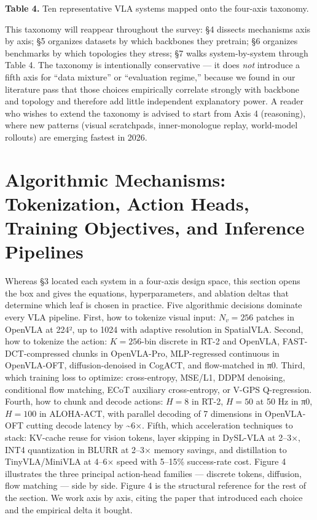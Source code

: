 \textbf{Table 4.} Ten representative VLA systems mapped onto the four-axis taxonomy.

This taxonomy will reappear throughout the survey: §4 dissects mechanisms axis by axis; §5 organizes datasets by which backbones they pretrain; §6 organizes benchmarks by which topologies they stress; §7 walks system-by-system through Table 4. The taxonomy is intentionally conservative --- it does \emph{not} introduce a fifth axis for ``data mixture'' or ``evaluation regime,'' because we found in our literature pass that those choices empirically correlate strongly with backbone and topology and therefore add little independent explanatory power. A reader who wishes to extend the taxonomy is advised to start from Axis 4 (reasoning), where new patterns (visual scratchpads, inner-monologue replay, world-model rollouts) are emerging fastest in 2026.

\section{Algorithmic Mechanisms: Tokenization, Action Heads, Training Objectives, and Inference Pipelines}\label{algorithmic-mechanisms-tokenization-action-heads-training-objectives-and-inference-pipelines}

Whereas §3 located each system in a four-axis design space, this section opens the box and gives the equations, hyperparameters, and ablation deltas that determine which leaf is chosen in practice. Five algorithmic decisions dominate every VLA pipeline. First, how to tokenize visual input: \(N_v=256\) patches in OpenVLA at 224², up to 1024 with adaptive resolution in SpatialVLA. Second, how to tokenize the action: \(K=256\)-bin discrete in RT-2 and OpenVLA, FAST-DCT-compressed chunks in OpenVLA-Pro, MLP-regressed continuous in OpenVLA-OFT, diffusion-denoised in CogACT, and flow-matched in π0. Third, which training loss to optimize: cross-entropy, MSE/L1, DDPM denoising, conditional flow matching, ECoT auxiliary cross-entropy, or V-GPS Q-regression. Fourth, how to chunk and decode actions: \(H=8\) in RT-2, \(H=50\) at 50 Hz in π0, \(H=100\) in ALOHA-ACT, with parallel decoding of 7 dimensions in OpenVLA-OFT cutting decode latency by \textasciitilde6×. Fifth, which acceleration techniques to stack: KV-cache reuse for vision tokens, layer skipping in DySL-VLA at 2--3×, INT4 quantization in BLURR at 2--3× memory savings, and distillation to TinyVLA/MiniVLA at 4--6× speed with 5--15\% success-rate cost. Figure 4 illustrates the three principal action-head families --- discrete tokens, diffusion, flow matching --- side by side. Figure 4 is the structural reference for the rest of the section. We work axis by axis, citing the paper that introduced each choice and the empirical delta it bought.

